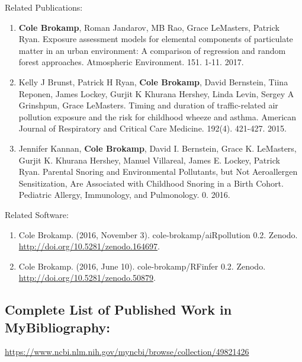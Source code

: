 \documentclass{nihbiosketch}
\begin{document}
\noindent Related Publications:

\begin{enumerate}
	
\item \textbf{Cole Brokamp}, Roman Jandarov, MB Rao, Grace LeMasters, Patrick Ryan. Exposure assessment models for elemental components of particulate matter in an urban environment: A comparison of regression and random forest approaches. Atmospheric Environment. 151. 1-11. 2017.

\item Kelly J Brunst, Patrick H Ryan, \textbf{Cole Brokamp}, David Bernstein, Tiina Reponen, James Lockey, Gurjit K Khurana Hershey, Linda Levin, Sergey A Grinshpun, Grace LeMasters. Timing and duration of traffic-related air pollution exposure and the risk for childhood wheeze and asthma. American Journal of Respiratory and Critical Care Medicine. 192(4). 421-427. 2015.

\item Jennifer Kannan, \textbf{Cole Brokamp}, David I. Bernstein, Grace K. LeMasters, Gurjit K. Khurana Hershey, Manuel Villareal, James E. Lockey, Patrick Ryan. Parental Snoring and Environmental Pollutants, but Not Aeroallergen Sensitization, Are Associated with Childhood Snoring in a Birth Cohort. Pediatric Allergy, Immunology, and Pulmonology. 0. 2016.

\end{enumerate}

\noindent Related Software:

\begin{enumerate}

\item Cole Brokamp. (2016, November 3). cole-brokamp/aiRpollution 0.2. Zenodo. \url{http://doi.org/10.5281/zenodo.164697}.

\item Cole Brokamp. (2016, June 10). cole-brokamp/RFinfer 0.2. Zenodo. \url{http://doi.org/10.5281/zenodo.50879}.

\end{enumerate}


\subsection*{Complete List of Published Work in MyBibliography:} 
\url{https://www.ncbi.nlm.nih.gov/myncbi/browse/collection/49821426}


\end{document}
